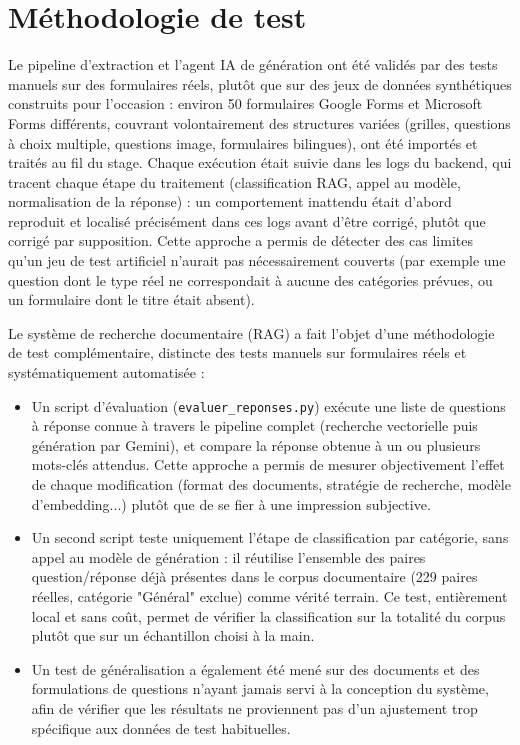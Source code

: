 \documentclass[12pt,a4paper]{report}
\begin{document}
\section{Méthodologie de test}

Le pipeline d'extraction et l'agent IA de génération ont été validés par
des tests manuels sur des formulaires réels, plutôt que sur des jeux de
données synthétiques construits pour l'occasion : environ 50 formulaires
Google Forms et Microsoft Forms différents, couvrant volontairement des
structures variées (grilles, questions à choix multiple, questions
image, formulaires bilingues), ont été importés et traités au fil du
stage. Chaque exécution était suivie dans les logs du backend, qui
tracent chaque étape du traitement (classification RAG, appel au modèle,
normalisation de la réponse) : un comportement inattendu était
d'abord reproduit et localisé précisément dans ces logs avant d'être
corrigé, plutôt que corrigé par supposition. Cette approche a permis de
détecter des cas limites qu'un jeu de test artificiel n'aurait pas
nécessairement couverts (par exemple une question dont le type réel ne
correspondait à aucune des catégories prévues, ou un formulaire dont le
titre était absent).

Le système de recherche documentaire (RAG) a fait l'objet d'une
méthodologie de test complémentaire, distincte des tests manuels sur
formulaires réels et systématiquement automatisée :

\begin{itemize}
    \item Un script d'évaluation (\texttt{evaluer\_reponses.py}) exécute
    une liste de questions à réponse connue à travers le pipeline complet
    (recherche vectorielle puis génération par Gemini), et compare la
    réponse obtenue à un ou plusieurs mots-clés attendus. Cette approche
    a permis de mesurer objectivement l'effet de chaque modification
    (format des documents, stratégie de recherche, modèle
    d'embedding...) plutôt que de se fier à une impression subjective.
    \item Un second script teste uniquement l'étape de classification par
    catégorie, sans appel au modèle de génération : il réutilise
    l'ensemble des paires question/réponse déjà présentes dans le corpus
    documentaire (229 paires réelles, catégorie "Général" exclue) comme
    vérité terrain. Ce test, entièrement local et sans coût, permet de
    vérifier la classification sur la totalité du corpus plutôt que sur
    un échantillon choisi à la main.
    \item Un test de généralisation a également été mené sur des
    documents et des formulations de questions n'ayant jamais servi à
    la conception du système, afin de vérifier que les résultats ne
    proviennent pas d'un ajustement trop spécifique aux données de test
    habituelles.
\end{itemize}
\end{document}
